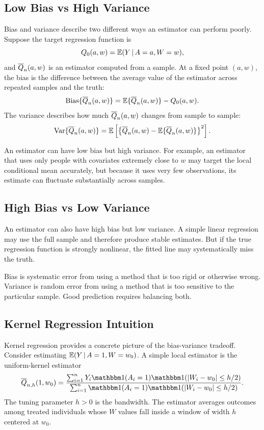 \label{lec:5-2}

\subsection{Low Bias vs High Variance}

Bias and variance describe two different ways an estimator can perform poorly.
Suppose the target regression function is
\[
Q_0(a,w)=\mathbb{E}(Y\,\vert\, A=a,W=w),
\]
and $\overline{Q}_n(a,w)$ is an estimator computed from a sample. At a fixed point
$(a,w)$, the bias is the difference between the average value of the estimator across
repeated samples and the truth:
\[
\operatorname{Bias}\{\overline{Q}_n(a,w)\}
=
\mathbb{E}\{\overline{Q}_n(a,w)\}-Q_0(a,w).
\]
The variance describes how much $\overline{Q}_n(a,w)$ changes from sample to sample:
\[
\operatorname{Var}\{\overline{Q}_n(a,w)\}
=
\mathbb{E}\left[
\left\{\overline{Q}_n(a,w)-\mathbb{E}\{\overline{Q}_n(a,w)\}\right\}^2
\right].
\]

An estimator can have low bias but high variance. For example, an estimator that uses
only people with covariates extremely close to $w$ may target the local conditional
mean accurately, but because it uses very few observations, its estimate can fluctuate
substantially across samples.

\subsection{High Bias vs Low Variance}

An estimator can also have high bias but low variance. A simple linear regression may
use the full sample and therefore produce stable estimates. But if the true regression
function is strongly nonlinear, the fitted line may systematically miss the truth.

\begin{keyidea}
Bias is systematic error from using a method that is too rigid or otherwise wrong.
Variance is random error from using a method that is too sensitive to the particular
sample. Good prediction requires balancing both.
\end{keyidea}

\subsection{Kernel Regression Intuition}

Kernel regression provides a concrete picture of the bias-variance tradeoff. Consider
estimating $\mathbb{E}(Y\,\vert\, A=1,W=w_0)$. A simple local estimator is the uniform-kernel
estimator
\[
\Qbar_{n,h}(1,w_0)
=
\frac{\sum_{i=1}^nY_i\ind(A_i=1)\ind(|W_i-w_0|\le h/2)}
       {\sum_{i=1}^n\ind(A_i=1)\ind(|W_i-w_0|\le h/2)}.
\]
The tuning parameter $h>0$ is the bandwidth. The estimator averages outcomes among
treated individuals whose $W$ values fall inside a window of width $h$ centered at
$w_0$.


